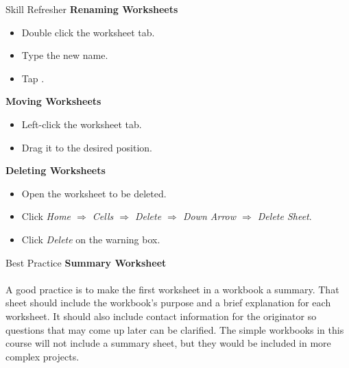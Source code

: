 \begin{center}
	\begin{sklbox}{Skill Refresher}
		\textbf{Renaming Worksheets}
		\\
		\begin{itemize}
			\setlength{\itemsep}{0pt}
			\setlength{\parskip}{0pt}
			\setlength{\parsep}{0pt}
			
			\item Double click the worksheet tab.
			\item Type the new name.
			\item Tap .
		\end{itemize}

		\hfill \break
		\textbf{Moving Worksheets}
		\\
		\begin{itemize}
			\setlength{\itemsep}{0pt}
			\setlength{\parskip}{0pt}
			\setlength{\parsep}{0pt}
			
			\item Left-click the worksheet tab.
			\item Drag it to the desired position.
		\end{itemize}

		\hfill \break
		\textbf{Deleting Worksheets}
		\\
		\begin{itemize}
			\setlength{\itemsep}{0pt}
			\setlength{\parskip}{0pt}
			\setlength{\parsep}{0pt}
			
			\item Open the worksheet to be deleted.
			\item Click \textit{Home $ \Rightarrow $ Cells $ \Rightarrow $ Delete $ \Rightarrow $ Down Arrow $ \Rightarrow $ Delete Sheet}.
			\item Click \textit{Delete} on the warning box.
		\end{itemize}

	\end{sklbox}
\end{center}

\begin{center}
	\begin{infobox}{Best Practice}
		\textbf{Summary Worksheet}
		\\
		\\
		A good practice is to make the first worksheet in a workbook a summary. That sheet should include the workbook's purpose and a brief explanation for each worksheet. It should also include contact information for the originator so questions that may come up later can be clarified. The simple workbooks in this course will not include a summary sheet, but they would be included in more complex projects.
	\end{infobox}
\end{center}


